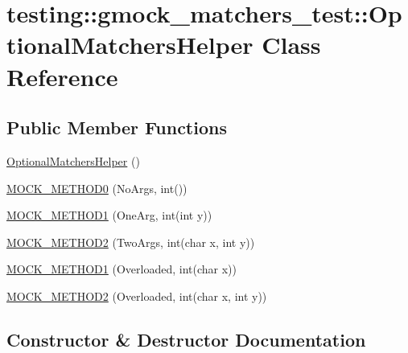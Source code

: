 \hypertarget{classtesting_1_1gmock__matchers__test_1_1OptionalMatchersHelper}{}\section{testing\+::gmock\+\_\+matchers\+\_\+test\+::Optional\+Matchers\+Helper Class Reference}
\label{classtesting_1_1gmock__matchers__test_1_1OptionalMatchersHelper}
\subsection*{Public Member Functions}
\begin{DoxyCompactItemize}
\item 
\mbox{\hyperlink{classtesting_1_1gmock__matchers__test_1_1OptionalMatchersHelper_a24d46bb3d75555049ed3799a34d9f6b5}{Optional\+Matchers\+Helper}} ()
\item 
\mbox{\hyperlink{classtesting_1_1gmock__matchers__test_1_1OptionalMatchersHelper_a8e2a60b72259529d2b6c0f37ac47dde9}{M\+O\+C\+K\+\_\+\+M\+E\+T\+H\+O\+D0}} (No\+Args, int())
\item 
\mbox{\hyperlink{classtesting_1_1gmock__matchers__test_1_1OptionalMatchersHelper_ab35fac331bbcf18e1a7e95305d4cc34d}{M\+O\+C\+K\+\_\+\+M\+E\+T\+H\+O\+D1}} (One\+Arg, int(int y))
\item 
\mbox{\hyperlink{classtesting_1_1gmock__matchers__test_1_1OptionalMatchersHelper_a51f6da96a6607d70c8ea6d5f4aedb39f}{M\+O\+C\+K\+\_\+\+M\+E\+T\+H\+O\+D2}} (Two\+Args, int(char x, int y))
\item 
\mbox{\hyperlink{classtesting_1_1gmock__matchers__test_1_1OptionalMatchersHelper_a782311cb85f341cf6b45f0b9f015e779}{M\+O\+C\+K\+\_\+\+M\+E\+T\+H\+O\+D1}} (Overloaded, int(char x))
\item 
\mbox{\hyperlink{classtesting_1_1gmock__matchers__test_1_1OptionalMatchersHelper_a2051b793f9f68027e8861ec999739b9a}{M\+O\+C\+K\+\_\+\+M\+E\+T\+H\+O\+D2}} (Overloaded, int(char x, int y))
\end{DoxyCompactItemize}


\subsection{Constructor \& Destructor Documentation}
\mbox{\label{classtesting_1_1gmock__matchers__test_1_1OptionalMatchersHelper_a24d46bb3d75555049ed3799a34d9f6b5}} 
